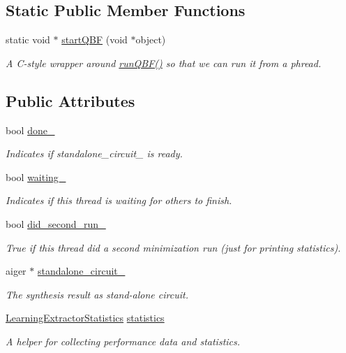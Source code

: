 \subsection*{Static Public Member Functions}
\begin{DoxyCompactItemize}
\item 
static void $\ast$ \hyperlink{classParExtractorQBFWorker_afec325c49f2787eaf5b454940c93db65}{start\-Q\-B\-F} (void $\ast$object)
\begin{DoxyCompactList}\small\item\em A C-\/style wrapper around \hyperlink{classParExtractorQBFWorker_ad4537c098860650b4594cc71310d0373}{run\-Q\-B\-F()} so that we can run it from a phread. \end{DoxyCompactList}\end{DoxyCompactItemize}
\subsection*{Public Attributes}
\begin{DoxyCompactItemize}
\item 
bool \hyperlink{classParExtractorWorker_a460487c299f8c86e745a940278d38ee0}{done\-\_\-}
\begin{DoxyCompactList}\small\item\em Indicates if standalone\-\_\-circuit\-\_\- is ready. \end{DoxyCompactList}\item 
bool \hyperlink{classParExtractorWorker_aad63a07af4e70719e53a4c41d67b6dd1}{waiting\-\_\-}
\begin{DoxyCompactList}\small\item\em Indicates if this thread is waiting for others to finish. \end{DoxyCompactList}\item 
bool \hyperlink{classParExtractorWorker_a99552e89edf3a3925430399207a1b13e}{did\-\_\-second\-\_\-run\-\_\-}
\begin{DoxyCompactList}\small\item\em True if this thread did a second minimization run (just for printing statistics). \end{DoxyCompactList}\item 
aiger $\ast$ \hyperlink{classParExtractorWorker_a233a7f99946695b0640e76ead6932fbb}{standalone\-\_\-circuit\-\_\-}
\begin{DoxyCompactList}\small\item\em The synthesis result as stand-\/alone circuit. \end{DoxyCompactList}\item 
\hyperlink{classLearningExtractorStatistics}{Learning\-Extractor\-Statistics} \hyperlink{classParExtractorWorker_a5e23f373a7959b56eb6f93036f98a1b1}{statistics}
\begin{DoxyCompactList}\small\item\em A helper for collecting performance data and statistics. \end{DoxyCompactList}\end{DoxyCompactItemize}
